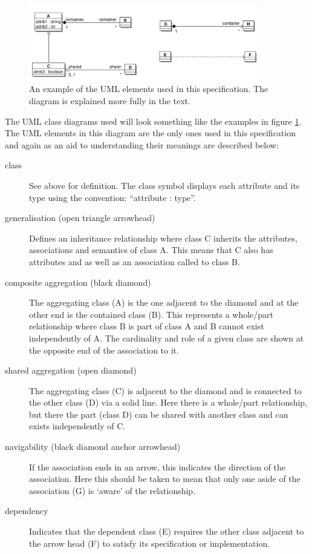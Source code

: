 \begin{figure}[htb]
\begin{center}
\includegraphics[width=0.9\textwidth]{images/exampleuml}
\caption{An example of the UML elements used in this
  specification. The diagram is explained more fully in the text.}
\label{fig:umlexample}
\end{center}
\end{figure}

The UML class diagrams used will look something like the examples in
figure \ref{fig:umlexample}. The UML elements in this diagram are the
only ones used in this specification and again as an aid to
understanding their meanings are described below:
\begin{description}
\item[class] See above for definition. The class symbol displays each
  attribute and its type using the convention: ``attribute : type''.
\item[generalisation (open triangle arrowhead)] Defines an inheritance
  relationship where class C inherits the attributes, associations and
  semantics of class A. This means that C also has attributes
   and  as well as an association
called  to class B.
\item[composite aggregation (black diamond)] The aggregating class
  (A) is the one adjacent to the diamond and at the other end is the
  contained class (B). This represents a whole/part
  relationship where class B is part of class A and B cannot exist
  independently of A. The cardinality and role of a given class are
  shown at the opposite end of the association to it.
\item[shared aggregation (open diamond)] The aggregating class (C) is
  adjacent to the diamond and is connected to the other class (D) via
  a solid line. Here there is a whole/part relationship, but there the
  part (class D) can be shared with another class and can exists
  independently of C.
\item[navigability (black diamond anchor arrowhead)] If the association ends in an arrow, this
  indicates the direction of the association. Here this should be
  taken to mean that only one aside of the association (G) is `aware' of the relationship.
\item[dependency] Indicates that the dependent class (E) requires the
  other class adjacent to the arrow head (F) to satisfy its
  specification or implementation.
\end{description}

